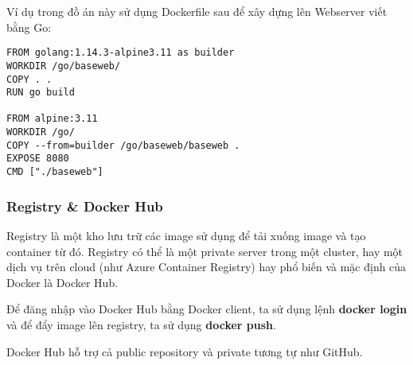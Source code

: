 Ví dụ trong đồ án này sử dụng Dockerfile sau để
xây dựng lên Webserver viết bằng Go:

\begin{lstlisting}[caption={Xây dựng image của back-end server},captionpos=b]
FROM golang:1.14.3-alpine3.11 as builder
WORKDIR /go/baseweb/
COPY . .
RUN go build

FROM alpine:3.11
WORKDIR /go/
COPY --from=builder /go/baseweb/baseweb .
EXPOSE 8080
CMD ["./baseweb"]
\end{lstlisting}

\subsubsection{Registry \& Docker Hub}
Registry là một kho lưu trữ các image sử dụng để tải xuống image
và tạo container từ đó. Registry có thể là một private server trong
một cluster, hay một dịch vụ trên cloud (như Azure Container
Registry) hay phổ biến và mặc định của Docker là Docker Hub.  

Để đăng nhập vào Docker Hub bằng Docker client, ta sử dụng lệnh
\textbf{docker login} và để đẩy image lên registry,
ta sử dụng \textbf{docker push}.

Docker Hub hỗ trợ cả public repository và private tương tự như GitHub. 
